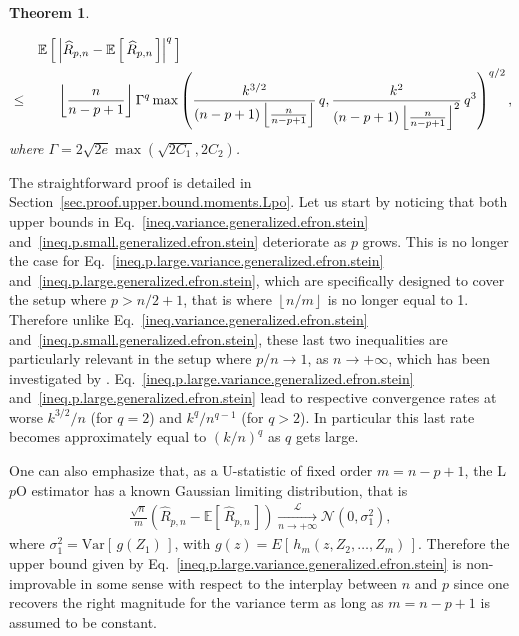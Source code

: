 \documentclass[twoside,11pt]{article}
\numberwithin{equation}{section}
\newcommand{\floor}[1]{\left\lfloor #1 \right\rfloor}
\newcommand{\1}{\mathds{1}}%
\newcommand{\paren}[1]{\left( #1 \right)}
\newcommand{\croch}[1]{\left[\, #1 \,\right]}
\newcommand{\abs}[1]{\left\lvert #1 \right\rvert} %
\newcommand{\E}{\mathbb{E}}
\newcommand{\Var}{\mathrm{Var}}
\newcommand{\Rh}{\widehat{R}}
\numberwithin{equation}{section}
\theoremstyle{plain}
\newtheorem{thm}{Theorem}[section]
\begin{document}
\begin{thm}
\begin{itemize}
\begin{eqnarray}\label{ineq.p.large.generalized.efron.stein}
&& \E\croch{ \abs{ \Rh_{p,n} - \E\croch{\Rh_{p,n}} }^{q} } \hspace*{8.5cm} \nonumber \\
%
&\leq & \floor{\frac{n}{n-p+1} } \Gamma^q  \max\paren{  \frac{k^{3/2} }{\paren{n-p+1}\floor{\frac{n}{n-p+1}} } \, q  ,    \frac{k^2}{ (n-p+1) \floor{\frac{n}{n-p+1}}^2} \, q^{3} }^{q/2} ,
\end{eqnarray}
where $\Gamma =2\sqrt{2e} \max\paren{    \sqrt{ 2 C_1  } ,  2 C_2 }$.
    \end{itemize}
\end{thm}
%
The straightforward proof is detailed in Section~\ref{sec.proof.upper.bound.moments.Lpo}.
%
Let us start by noticing that both upper bounds in Eq.~\eqref{ineq.variance.generalized.efron.stein} and~\eqref{ineq.p.small.generalized.efron.stein} deteriorate as $p$ grows.
%
This is no longer the case for Eq.~\eqref{ineq.p.large.variance.generalized.efron.stein} and~\eqref{ineq.p.large.generalized.efron.stein}, which are specifically designed to cover the setup where $p>n/2+1$, that is where $\floor{n/m}$ is no longer equal to 1.
%
Therefore unlike Eq.~\eqref{ineq.variance.generalized.efron.stein} and~\eqref{ineq.p.small.generalized.efron.stein}, these last two inequalities are particularly relevant in the setup where $p/n\to 1$, as $n\to +\infty$, which has been investigated by \cite{Sha:1993,Yan:2006,Yang07,Celi_2014}.
Eq.~\eqref{ineq.p.large.variance.generalized.efron.stein} and~\eqref{ineq.p.large.generalized.efron.stein} lead to respective convergence rates at worse $k^{3/2}/n$ (for $q=2$) and $k^q/n^{q-1}$ (for $q>2$). In particular this last rate becomes approximately equal to $(k/n)^q$ as $q$ gets large.


One can also emphasize that, as a U-statistic of fixed order $m=n-p+1$, the L$p$O estimator has a known Gaussian limiting distribution, that is \citep[see Theorem~A, Section~5.5.1][]{Serf:1980}
\begin{align*}
\frac{\sqrt{n}}{m} \paren{ \Rh_{p,n} - \E\croch{\Rh_{p,n}} } \xrightarrow[n\to +\infty]{\mathcal{L}} \mathcal{N}\paren{0, \sigma_1^2} ,
\end{align*}
where $\sigma_1^2 = \Var\croch{ g(Z_1) } $, with $g(z) = E\croch{ h_m(z,Z_2,\ldots,Z_{m}) }$.
%
Therefore the upper bound given by Eq.~\eqref{ineq.p.large.variance.generalized.efron.stein} is non-improvable in some sense with respect to the interplay between $n$ and $p$ since one recovers the right magnitude for the variance term as long as $m=n-p+1$ is assumed to be constant.
\end{document}
